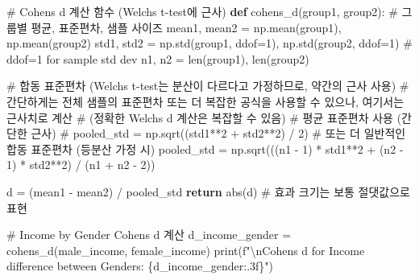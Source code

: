 \documentclass[
  letterpaper,
]{book}
\newenvironment{Shaded}{\begin{snugshade}}{\end{snugshade}}
\newcommand{\BuiltInTok}[1]{\textcolor[rgb]{0.00,0.23,0.31}{#1}}
\newcommand{\CharTok}[1]{\textcolor[rgb]{0.13,0.47,0.30}{#1}}
\newcommand{\CommentTok}[1]{\textcolor[rgb]{0.37,0.37,0.37}{#1}}
\newcommand{\ControlFlowTok}[1]{\textcolor[rgb]{0.00,0.23,0.31}{\textbf{#1}}}
\newcommand{\DecValTok}[1]{\textcolor[rgb]{0.68,0.00,0.00}{#1}}
\newcommand{\KeywordTok}[1]{\textcolor[rgb]{0.00,0.23,0.31}{\textbf{#1}}}
\newcommand{\NormalTok}[1]{\textcolor[rgb]{0.00,0.23,0.31}{#1}}
\newcommand{\OperatorTok}[1]{\textcolor[rgb]{0.37,0.37,0.37}{#1}}
\newcommand{\SpecialCharTok}[1]{\textcolor[rgb]{0.37,0.37,0.37}{#1}}
\newcommand{\SpecialStringTok}[1]{\textcolor[rgb]{0.13,0.47,0.30}{#1}}
\begin{document}
\begin{Shaded}
\begin{Highlighting}[]
    \CommentTok{\# Cohen\textquotesingle{}s d 계산 함수 (Welch\textquotesingle{}s t{-}test에 근사)}
    \KeywordTok{def}\NormalTok{ cohens\_d(group1, group2):}
        \CommentTok{\# 그룹별 평균, 표준편차, 샘플 사이즈}
\NormalTok{        mean1, mean2 }\OperatorTok{=}\NormalTok{ np.mean(group1), np.mean(group2)}
\NormalTok{        std1, std2 }\OperatorTok{=}\NormalTok{ np.std(group1, ddof}\OperatorTok{=}\DecValTok{1}\NormalTok{), np.std(group2, ddof}\OperatorTok{=}\DecValTok{1}\NormalTok{) }\CommentTok{\# ddof=1 for sample std dev}
\NormalTok{        n1, n2 }\OperatorTok{=} \BuiltInTok{len}\NormalTok{(group1), }\BuiltInTok{len}\NormalTok{(group2)}

        \CommentTok{\# 합동 표준편차 (Welch\textquotesingle{}s t{-}test는 분산이 다르다고 가정하므로, 약간의 근사 사용)}
        \CommentTok{\# 간단하게는 전체 샘플의 표준편차 또는 더 복잡한 공식을 사용할 수 있으나, 여기서는 근사치로 계산}
        \CommentTok{\# (정확한 Welch\textquotesingle{}s d 계산은 복잡할 수 있음)}
        \CommentTok{\# 평균 표준편차 사용 (간단한 근사)}
        \CommentTok{\# pooled\_std = np.sqrt((std1**2 + std2**2) / 2)}
        \CommentTok{\# 또는 더 일반적인 합동 표준편차 (등분산 가정 시)}
\NormalTok{        pooled\_std }\OperatorTok{=}\NormalTok{ np.sqrt(((n1 }\OperatorTok{{-}} \DecValTok{1}\NormalTok{) }\OperatorTok{*}\NormalTok{ std1}\OperatorTok{**}\DecValTok{2} \OperatorTok{+}\NormalTok{ (n2 }\OperatorTok{{-}} \DecValTok{1}\NormalTok{) }\OperatorTok{*}\NormalTok{ std2}\OperatorTok{**}\DecValTok{2}\NormalTok{) }\OperatorTok{/}\NormalTok{ (n1 }\OperatorTok{+}\NormalTok{ n2 }\OperatorTok{{-}} \DecValTok{2}\NormalTok{))}

\NormalTok{        d }\OperatorTok{=}\NormalTok{ (mean1 }\OperatorTok{{-}}\NormalTok{ mean2) }\OperatorTok{/}\NormalTok{ pooled\_std}
        \ControlFlowTok{return} \BuiltInTok{abs}\NormalTok{(d) }\CommentTok{\# 효과 크기는 보통 절댓값으로 표현}

    \CommentTok{\# Income by Gender Cohen\textquotesingle{}s d 계산}
\NormalTok{    d\_income\_gender }\OperatorTok{=}\NormalTok{ cohens\_d(male\_income, female\_income)}
    \BuiltInTok{print}\NormalTok{(}\SpecialStringTok{f"}\CharTok{\textbackslash{}n}\SpecialStringTok{Cohen\textquotesingle{}s d for Income difference between Genders: }\SpecialCharTok{\{}\NormalTok{d\_income\_gender}\SpecialCharTok{:.3f\}}\SpecialStringTok{"}\NormalTok{)}


\end{Highlighting}
\end{Shaded}
\end{document}

